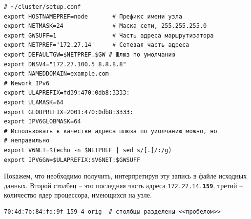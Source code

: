 \documentclass[12pt]{article}
\begin{document}
\label{conforig}
\begin{verbatim}
# ~/cluster/setup.conf
export HOSTNAMEPREF=node       # Префикс имени узла
export NETMASK=24              # Маска сети, 255.255.255.0
export GWSUFF=1                # Часть адреса маршрутизатора
export NETPREF='172.27.14'     # Сетевая часть адреса
export DEFAULTGW=$NETPREF.$GW # Шлюз по умолчанию
export DNSV4="172.27.100.5 8.8.8.8"
export NAMEDDOMAIN=example.com
# Nework IPv6
export ULAPREFIX=fd39:470:0db8:3333:
export ULAMASK=64
export GLOBPREFIX=2001:470:0db8:3333:
export IPV6GLOBMASK=64
# Использовать в качестве адреса шлюза по уиолчанию можно, но
# неправильно
export V6NET=$(echo -n $NETPREF | sed s/[.]/:/g)
export IPV6GW=$ULAPREFIX:$V6NET:$GWSUFF
\end{verbatim}

Покажем, что необходимо получить, интерпретируя эту запись в файле исходных данных. Второй столбец -- это последняя часть адреса \texttt{172.27.14.\textbf{159}}, третий -- количество ядер процессора, имеющихся на узле.
\begin{verbatim}
70:4d:7b:84:fd:9f 159 4 orig  # столбцы разделены <<пробелом>>
\end{verbatim}
\end{document}

